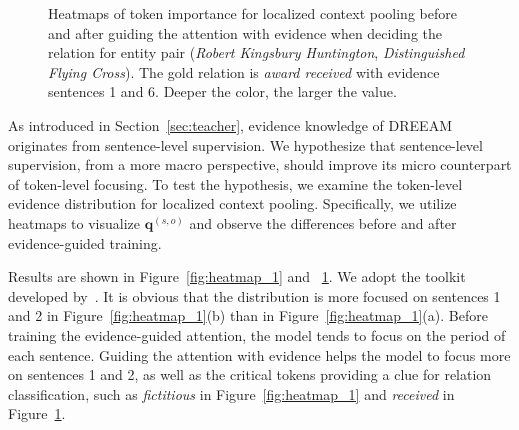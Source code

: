 \documentclass[11pt]{article}
\begin{document}
\begin{figure}[t!]
    \centering
\caption{Heatmaps of token importance for localized context pooling before and after guiding the attention with evidence when deciding the relation for entity pair (\textit{Robert Kingsbury Huntington}, \textit{Distinguished Flying Cross}). The gold relation is \textit{award received} with evidence sentences 1 and 6. Deeper the color, the larger the value. }
    \label{fig:heatmap_2}
\end{figure}

As introduced in Section~\ref{sec:teacher}, evidence knowledge of DREEAM originates from sentence-level supervision.
We hypothesize that sentence-level supervision, from a more macro perspective, should improve its micro counterpart of token-level focusing.
To test the hypothesis, we examine the token-level evidence distribution for localized context pooling.
Specifically, we utilize heatmaps to visualize $\bm{q}^{(s,o)}$ and observe the differences before and after evidence-guided training.

Results are shown in Figure~\ref{fig:heatmap_1} and ~\ref{fig:heatmap_2}. 
We adopt the toolkit developed by~\citet{yang-zhang-2018-ncrf}.
It is obvious that the distribution is more focused on sentences 1 and 2 in Figure~\ref{fig:heatmap_1}(b) than in Figure~\ref{fig:heatmap_1}(a).
Before training the evidence-guided attention, the model tends to focus on the period of each sentence.
Guiding the attention with evidence helps the model to focus more on sentences 1 and 2, as well as the critical tokens providing a clue for relation classification, such as \textit{fictitious} in Figure~\ref{fig:heatmap_1} and \textit{received} in Figure~\ref{fig:heatmap_2}.
\end{document}
